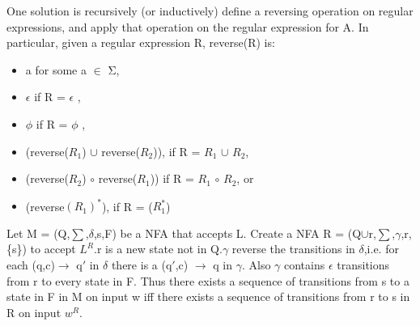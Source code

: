 \documentclass{scrartcl}
\begin{document}
One solution is recursively (or inductively) define a reversing operation on regular
expressions, and apply that operation on the regular expression for A. In particular, given a
regular expression R, reverse(R) is:

\begin{itemize}

\item a for some a $\in$ Σ,
\item $\epsilon$ if R = $\epsilon$ ,
\item $\phi$ if R = $\phi$ ,
\item (reverse($R_1$) $\cup$ reverse($R_2$)), if R = $R_1$ $\cup$ $R_2$,
\item	(reverse($R_2$) $\circ$ reverse($R_1$)) if R = $R_1$ $\circ$ $R_2$, or 
\item (reverse$(R_1)^*$), if R = ($R^*_1$)

\end{itemize}

Let M = (Q,$\sum$,$\delta$,s,F) be a NFA that accepts L. Create a NFA R = (Q$\cup${r},$\sum$,$\gamma$,r,\{s\}) to accept $L^R$.r is a new state not in Q.$\gamma$ reverse the transitions in $\delta$,i.e. for each (q,c)$\to$ q$\prime$ in $\delta$ there is a (q$\prime$,c)
$\to$ q in $\gamma$. Also $\gamma$ contains $\epsilon$ transitions from r to every state in F. Thus there exists a sequence of transitions from s to a state in F in M on input w iff there exists a sequence of transitions from r to s in R on input $w^R$.
\end{document}

